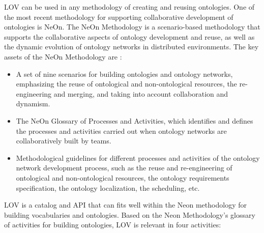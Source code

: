 \documentclass{iosart2c}
\begin{document}
LOV can be used in any methodology of creating and reusing ontologies. One of the most recent methodology for supporting collaborative development of ontologies is NeOn.  
The NeOn Methodology is a scenario-based methodology that supports the collaborative aspects of ontology development and reuse, as well as the dynamic evolution of ontology networks in distributed environments. The key assets of the NeOn Methodology are \cite{MC10}:
\begin{itemize}
 \item  A set of nine scenarios for building ontologies and ontology networks, emphasizing the reuse of ontological and non-ontological resources, the re-engineering and merging, and taking into account collaboration and dynamism.
 \item The NeOn Glossary of Processes and Activities, which identifies and defines the processes and activities carried out when ontology networks are collaboratively built by teams.
 \item Methodological guidelines for different processes and activities of the ontology network development process, such as the reuse and re-engineering of ontological and non-ontological resources, the ontology requirements specification, the ontology localization, the scheduling, etc.
\end{itemize}


LOV is a catalog and API that can fits well within the Neon methodology for building vocabularies and ontologies. Based on the Neon Methodology's glossary of activities for building ontologies, LOV is relevant in four activities:
\end{document}
